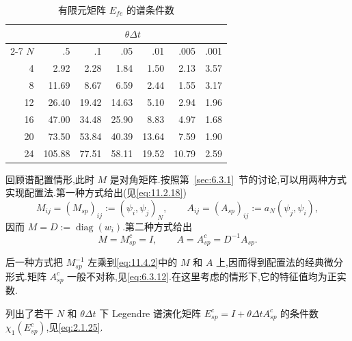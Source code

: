 \begin{table}[htbp]
  \centering
  \caption{有限元矩阵 \(E_{fe}\) 的谱条件数}\label{tab:11.4.1}
  \begin{tabular}{rrrrrrr}
    \toprule
       & \multicolumn{6}{c}{\(\theta\Delta t\)}\\
    \cmidrule(lr){2-7}
    \(N\) & .5 & .1 & .05 & .01 & .005 & .001\\
    \midrule
     4 &   2.92 &  2.28 &  1.84 &  1.50 &  2.13 & 3.57\\
     8 &  11.69 &  8.67 &  6.59 &  2.44 &  1.55 & 3.17\\
    12 &  26.40 & 19.42 & 14.63 &  5.10 &  2.94 & 1.96\\
    16 &  47.00 & 34.48 & 25.90 &  8.83 &  4.97 & 1.68\\
    20 &  73.50 & 53.84 & 40.39 & 13.64 &  7.59 & 1.90\\
    24 & 105.88 & 77.51 & 58.11 & 19.52 & 10.79 & 2.59\\
    \bottomrule
  \end{tabular}
\end{table}

回顾谱配置情形,此时 \(M\) 是对角矩阵.按照第~\ref{sec:6.3.1}~节的讨论,可以用两种方式实现配置法.第一种方式给出(见\eqref{eq:11.2.18})
\begin{equation}\label{eq:11.4.2}
  M_{ij}=(M_{sp})_{ij}:=(\psi_i,\psi_j)_N,\qquad
  A_{ij}=(A_{sp})_{ij}:=a_N(\psi_j,\psi_i),
\end{equation}
因而 \(M=D:=\operatorname{diag}(w_i)\).第二种方式给出
\begin{equation}\label{eq:11.4.3}
  M=M_{sp}^c=I,\qquad A=A_{sp}^c=D^{-1}A_{sp}.
\end{equation}

后一种方式把 \(M_{sp}^{-1}\) 左乘到\eqref{eq:11.4.2}中的 \(M\) 和 \(A\) 上,因而得到配置法的经典微分形式.矩阵 \(A_{sp}^c\) 一般不对称,见\eqref{eq:6.3.12}.在这里考虑的情形下,它的特征值均为正实数.

列出了若干 \(N\) 和 \(\theta\Delta t\) 下 Legendre 谱演化矩阵 \(E_{sp}^c=I+\theta\Delta t A_{sp}^c\) 的条件数 \(\chi_1(E_{sp}^c)\),见\eqref{eq:2.1.25}.

